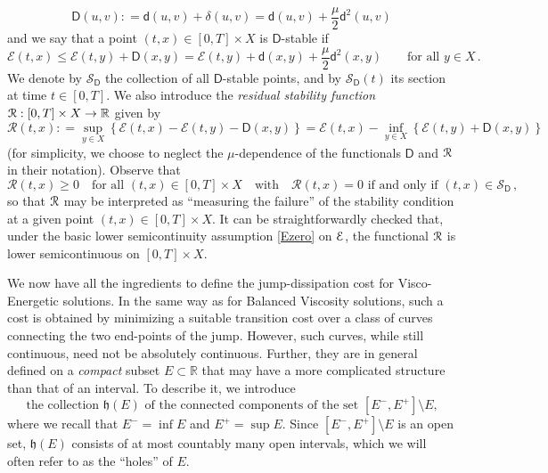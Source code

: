 \documentclass[a4paper,10pt,reqno]{amsart} %
\newcommand{\R}{\mathbb{R}}
\numberwithin{equation}{section}
\newcommand{\Xs}{X}
\newcommand{\mdn}{\mathsf{d}}
\newcommand{\md}[2]{\mathsf{d}(#1,#2)}
\newcommand{\ene}[2]{\mathcal{E}(#1,#2)}
\newcommand{\cmdn}{\mathsf{D}}
\newcommand{\cmd}[2]{\mathsf{D}(#1,#2)}
\newcommand{\corr}[2]{\delta(#1,#2)}
\newcommand{\stab}[1]{\mathscr{S}_{#1}}
\newcommand{\stabi}[2]{\mathscr{S}_{#1}(#2)}
\newcommand{\rstab}[2]{\mathcal{R}(#1,#2)}
\newcommand{\hole}[1]{\mathfrak{h}(#1)}
\begin{document}
\begin{equation}
\label{cmdn}
\cmd uv: = \md u v + \corr uv = \md u v +\frac \mu2 \mdn^2(u,v)
\end{equation}
and 
we say that a point $(t,x)\in [0,T]\times \Xs$ is $\cmdn$-stable if \begin{equation}
\label{cmdn-stab}
\ene tx \leq \ene ty + \cmd xy = \ene ty +\md xy +\frac\mu2 \mdn^2(x,y)  \qquad \text{for all } y \in \Xs\,.
\end{equation}
We denote by $\stab \cmdn$ the collection of all $\cmdn$-stable points, and by $\stabi \cmdn t$ its section at time $t\in [0,T]$. We also introduce the \emph{residual stability function} $\calR:[0,T]\times \Xs \to \R$ given by 
\begin{equation}
\label{residual-stability-function}
\rstab tx: = \sup_{y\in \Xs} \left\{ \ene tx - \ene ty -\cmd xy \right\} = \ene tx - \inf_{y\in \Xs} \left\{ \ene ty+\cmd xy\right\}
\end{equation}
(for simplicity, we choose to neglect the $\mu$-dependence of the functionals $\cmdn$ and ${\mathcal R}$ in their notation). 
Observe that
\begin{equation}
\label{propR}
\rstab tx \geq 0 \quad \text{for all } (t,x) \in [0,T]\times \Xs \quad \text{with} \quad \rstab tx=0 \text{ if and only if } (t,x) \in \stab \cmdn\,,
\end{equation}
so that ${\mathcal R}$ may be interpreted as 
``measuring the failure'' of the stability condition at a given point  $(t,x) \in [0,T]\times \Xs$.
It can be straightforwardly checked that,  under the basic lower semicontinuity assumption \eqref{Ezero} on ${\mathcal E}$, the functional ${\mathcal R}$ is lower semicontinuous on $[0,T]\times \Xs$. 
\par
We now have all the ingredients to define the jump-dissipation cost for Visco-Energetic solutions. In the same way as for Balanced Viscosity solutions, such a  cost is obtained by minimizing a suitable transition cost over a class of curves connecting the two end-points of the jump. 
However, such curves, while still continuous, need not be absolutely continuous. Further, they are in general defined on a \emph{compact} subset $E\subset\R$ that may have  a  more complicated structure than that of an interval. To describe it, we 
introduce
\begin{equation}
\label{holes}
\text{the collection $\hole E$ of the connected components of the  set $[E^-,E^+]\setminus E$,}
\end{equation}
where we recall that $E^-=\inf E$ and $E^+=\sup E$. Since $[E^-,E^+]\setminus E$ is an open set, $\hole E$ consists of at most countably many open intervals, which we will often refer to as the ``holes'' of $E$. 
\end{document}
